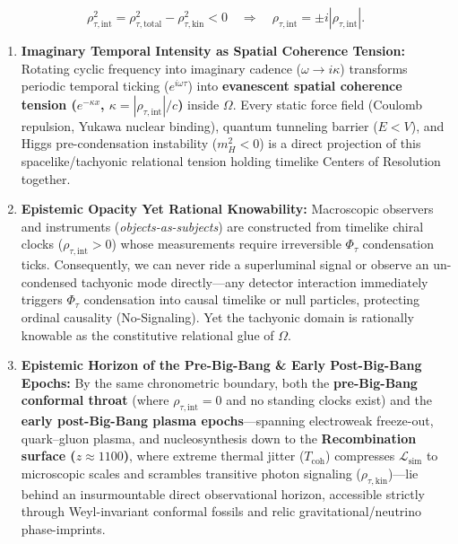 \documentclass[
]{article}
\providecommand{\tightlist}{%
  \setlength{\itemsep}{0pt}\setlength{\parskip}{0pt}}
\begin{document}
\[\rho_{\tau,\text{int}}^2 = \rho_{\tau,\text{total}}^2 - \rho_{\tau,\text{kin}}^2 < 0 \quad \Longrightarrow \quad \rho_{\tau,\text{int}} = \pm i |\rho_{\tau,\text{int}}|.\]

\begin{enumerate}
\def\labelenumi{\arabic{enumi}.}
\tightlist
\item
  \textbf{Imaginary Temporal Intensity as Spatial Coherence Tension:}
  Rotating cyclic frequency into imaginary cadence
  (\(\omega \to i\kappa\)) transforms periodic temporal ticking
  (\(e^{i\omega\tau}\)) into \textbf{evanescent spatial coherence
  tension (\(e^{-\kappa x}\), \(\kappa = |\rho_{\tau,\text{int}}|/c\))}
  inside \(\Omega\). Every static force field (Coulomb repulsion, Yukawa
  nuclear binding), quantum tunneling barrier (\(E < V\)), and Higgs
  pre-condensation instability (\(m_H^2 < 0\)) is a direct projection of
  this spacelike/tachyonic relational tension holding timelike Centers
  of Resolution together.
\item
  \textbf{Epistemic Opacity Yet Rational Knowability:} Macroscopic
  observers and instruments (\emph{objects-as-subjects}) are constructed
  from timelike chiral clocks (\(\rho_{\tau,\text{int}} > 0\)) whose
  measurements require irreversible \(\Phi_\tau\) condensation ticks.
  Consequently, we can never ride a superluminal signal or observe an
  un-condensed tachyonic mode directly---any detector interaction
  immediately triggers \(\Phi_\tau\) condensation into causal timelike
  or null particles, protecting ordinal causality (No-Signaling). Yet
  the tachyonic domain is rationally knowable as the constitutive
  relational glue of \(\Omega\).
\item
  \textbf{Epistemic Horizon of the Pre-Big-Bang \& Early Post-Big-Bang
  Epochs:} By the same chronometric boundary, both the
  \textbf{pre-Big-Bang conformal throat} (where
  \(\rho_{\tau,\text{int}} = 0\) and no standing clocks exist) and the
  \textbf{early post-Big-Bang plasma epochs}---spanning electroweak
  freeze-out, quark--gluon plasma, and nucleosynthesis down to the
  \textbf{Recombination surface (\(z \approx 1100\))}, where extreme
  thermal jitter (\(T_{\text{coh}}\)) compresses
  \(\mathcal{L}_{\text{sim}}\) to microscopic scales and scrambles
  transitive photon signaling (\(\rho_{\tau,\text{kin}}\))---lie behind
  an insurmountable direct observational horizon, accessible strictly
  through Weyl-invariant conformal fossils and relic
  gravitational/neutrino phase-imprints.
\end{enumerate}
\end{document}
